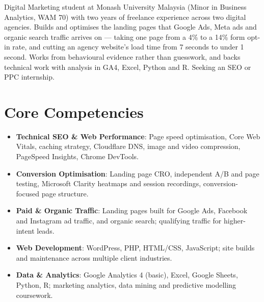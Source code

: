 \documentclass[11pt,a4paper,sans]{moderncv}
\begin{document}
\makecvtitle


\vspace{6pt}
\small{Digital Marketing student at Monash University Malaysia (Minor in Business Analytics, WAM 70) with two years of freelance experience across two digital agencies. Builds and optimises the landing pages that Google Ads, Meta ads and organic search traffic arrives on --- taking one page from a 4\% to a 14\% form opt-in rate, and cutting an agency website's load time from 7 seconds to under 1 second. Works from behavioural evidence rather than guesswork, and backs technical work with analysis in GA4, Excel, Python and R. Seeking an SEO or PPC internship.}


\section{Core Competencies}
\vspace{1pt}
\begin{itemize}

\item \textbf{Technical SEO \& Web Performance}: Page speed optimisation, Core Web Vitals, caching strategy, Cloudflare DNS, image and video compression, PageSpeed Insights, Chrome DevTools.

\item \textbf{Conversion Optimisation}: Landing page CRO, independent A/B and page testing, Microsoft Clarity heatmaps and session recordings, conversion-focused page structure.

\item \textbf{Paid \& Organic Traffic}: Landing pages built for Google Ads, Facebook and Instagram ad traffic, and organic search; qualifying traffic for higher-intent leads.

\item \textbf{Web Development}: WordPress, PHP, HTML/CSS, JavaScript; site builds and maintenance across multiple client industries.

\item \textbf{Data \& Analytics}: Google Analytics 4 (basic), Excel, Google Sheets, Python, R; marketing analytics, data mining and predictive modelling coursework.

\end{itemize}
\end{document}
